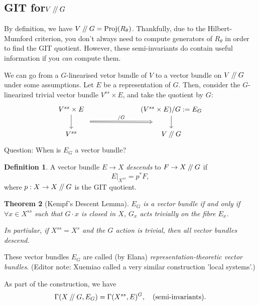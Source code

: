 \documentclass{article}
\newtheorem{theorem}{Theorem}
\theoremstyle{definition}
\newtheorem{definition}[theorem]{Definition}
\theoremstyle{remark}
\numberwithin{theorem}{section}
\newcommand{\sslash}{\mathbin{/\mkern-4mu/}}
\newcommand{\Proj}{\text{Proj}}
\newenvironment{defn}{
	\begin{mdframed}
		\vspace{-0.5em}
		\begin{definition}
		}{
		\end{definition}
	\end{mdframed}
}
\begin{document}
			\subsection{GIT for$V\sslash G$}
			By definition, we have $V\sslash G = \Proj(R_\theta)$. Thankfully, due to the Hilbert-Mumford criterion, you don't always need to compute generators of $R_\theta$ in order to find the GIT quotient. However, these semi-invariants do contain useful information if you \emph{can} compute them. \vspace{1em}
			
			We can go from a $G$-linearised vetor bundle of $V$ to a vector bundle on $V\sslash G$ under some assumptions.  Let $E$ be a representation of $G$. Then, consider the $G$-linearized trivial vector bundle $V^{ss}\times E$, and take the quotient by $G$:
\[\begin{tikzcd}
	{V^{ss}\times E} &&& {(V^{ss}\times E)/G := E_G} \\
	{V^{ss}} &&& {V\sslash G}
	\arrow[""{name=0, anchor=center, inner sep=0}, from=1-1, to=2-1]
	\arrow[""{name=1, anchor=center, inner sep=0}, from=1-4, to=2-4]
	\arrow["{/G}", shorten <=26pt, shorten >=26pt, Rightarrow, from=0, to=1]
\end{tikzcd}\]
			Question: When is $E_G$ a vector bundle?
			\begin{defn}
				A vector bundle $E\to X$ \emph{descends} to $F\to X\sslash G$ if
				\begin{equation}
					E|_{X^{ss}} = p^\ast F,
				\end{equation}
				where $p:X\to X\sslash G$ is the GIT quotient.
			\end{defn}
			\begin{theorem}[Kempf's Descent Lemma]
				$E_G$ is a vector bundle if and only if $\forall x\in X^{ss}$ such that $G\cdot x$ is closed in $X$, $G_x$ acts trivially on the fibre $E_x$. \vspace{1em}
				
				In partiular, if $X^{ss}=X^{s}$ and the $G$ action is trivial, then all vector bundles descend.
			\end{theorem}
			These vector bundles $E_G$ are called (by Elana) \emph{representation-theoretic vector bundles}. (Editor note: Xuemiao called a very similar construction  'local systems'.) \vspace{1em}
			
			As part of the construction, we have
			\begin{equation}
				\Gamma(X\sslash G, E_G) = \Gamma(X^{ss}, E)^G, \quad \text{(semi-invariants)}.
			\end{equation}
			
\end{document}
